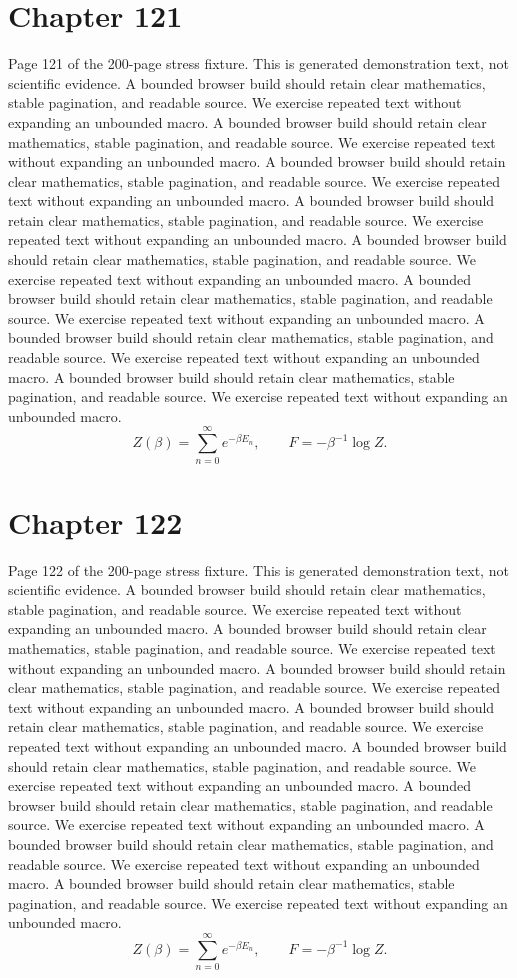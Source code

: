 \documentclass[11pt]{article}
\begin{document}
\section*{Chapter 121}
Page 121 of the 200-page stress fixture. This is generated demonstration text, not scientific evidence.
A bounded browser build should retain clear mathematics, stable pagination, and readable source. We exercise repeated text without expanding an unbounded macro.
A bounded browser build should retain clear mathematics, stable pagination, and readable source. We exercise repeated text without expanding an unbounded macro.
A bounded browser build should retain clear mathematics, stable pagination, and readable source. We exercise repeated text without expanding an unbounded macro.
A bounded browser build should retain clear mathematics, stable pagination, and readable source. We exercise repeated text without expanding an unbounded macro.
A bounded browser build should retain clear mathematics, stable pagination, and readable source. We exercise repeated text without expanding an unbounded macro.
A bounded browser build should retain clear mathematics, stable pagination, and readable source. We exercise repeated text without expanding an unbounded macro.
A bounded browser build should retain clear mathematics, stable pagination, and readable source. We exercise repeated text without expanding an unbounded macro.
A bounded browser build should retain clear mathematics, stable pagination, and readable source. We exercise repeated text without expanding an unbounded macro.
\[Z(\beta)=\sum_{n=0}^{\infty}e^{-\beta E_n},\qquad F=-\beta^{-1}\log Z.\]
\newpage
\section*{Chapter 122}
Page 122 of the 200-page stress fixture. This is generated demonstration text, not scientific evidence.
A bounded browser build should retain clear mathematics, stable pagination, and readable source. We exercise repeated text without expanding an unbounded macro.
A bounded browser build should retain clear mathematics, stable pagination, and readable source. We exercise repeated text without expanding an unbounded macro.
A bounded browser build should retain clear mathematics, stable pagination, and readable source. We exercise repeated text without expanding an unbounded macro.
A bounded browser build should retain clear mathematics, stable pagination, and readable source. We exercise repeated text without expanding an unbounded macro.
A bounded browser build should retain clear mathematics, stable pagination, and readable source. We exercise repeated text without expanding an unbounded macro.
A bounded browser build should retain clear mathematics, stable pagination, and readable source. We exercise repeated text without expanding an unbounded macro.
A bounded browser build should retain clear mathematics, stable pagination, and readable source. We exercise repeated text without expanding an unbounded macro.
A bounded browser build should retain clear mathematics, stable pagination, and readable source. We exercise repeated text without expanding an unbounded macro.
\[Z(\beta)=\sum_{n=0}^{\infty}e^{-\beta E_n},\qquad F=-\beta^{-1}\log Z.\]
\newpage
\end{document}
